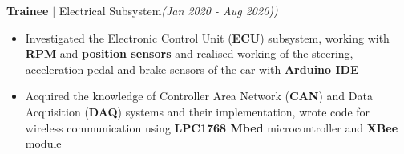 \documentclass[10pt,a4paper,sans]{moderncv}        %
\newcommand{\rhsmalle}[1]{\hfill{\footnotesize{\textsl{(#1)}}}\\[-12pt]}
\begin{document}
{\normalsize\textbf{Trainee} \small$\mid$ Electrical Subsystem}\rhsmalle{Jan 2020 - Aug 2020)}
\begin{itemize}
	\item Investigated the {Electronic Control Unit} (\textbf{ECU}) subsystem, working with \textbf{RPM} and \textbf{position sensors} and realised working of the steering, acceleration pedal and brake sensors of the car with \textbf{Arduino IDE} 
	\item Acquired the knowledge of {Controller Area Network} (\textbf{CAN}) and {Data Acquisition} (\textbf{DAQ}) systems and their implementation, wrote code for wireless communication using \textbf{LPC1768 Mbed} microcontroller and \textbf{XBee} module
\end{itemize}
\end{document}
